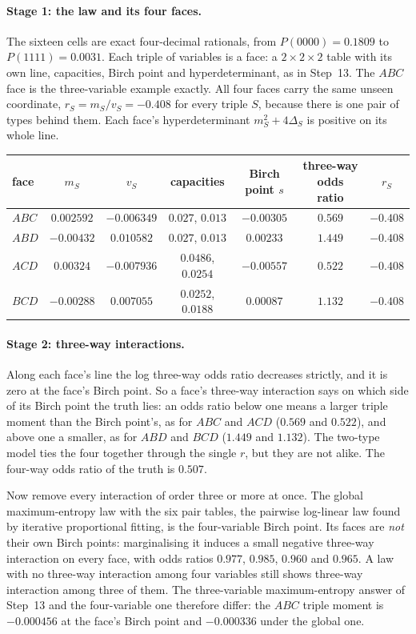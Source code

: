 \documentclass[11pt]{article}
\theoremstyle{definition}\newtheorem{definition}{Definition}\newtheorem{remark}{Remark}
\begin{document}
\paragraph{Stage 1: the law and its four faces.} The sixteen cells are exact four-decimal rationals, from $P(0000)=0.1809$ to
$P(1111)=0.0031$. Each triple of variables is a face: a $2\times2\times2$ table with its own line, capacities, Birch point and
hyperdeterminant, as in Step~13. The $ABC$ face is the three-variable example exactly. All four faces carry the same unseen coordinate,
$r_S=m_S/v_S=-0.408$ for every triple $S$, because there is one pair of types behind them. Each face's hyperdeterminant
$m_S^2+4\Delta_S$ is positive on its whole line.
\begin{center}\small
\begin{tabular}{lcccccc}\toprule
face & $m_S$ & $v_S$ & capacities & Birch point $s$ & three-way odds ratio & $r_S$\\\midrule
$ABC$ & $0.002592$ & $-0.006349$ & $0.027$, $0.013$ & $-0.00305$ & $0.569$ & $-0.408$\\
$ABD$ & $-0.00432$ & $0.010582$ & $0.027$, $0.013$ & $0.00233$ & $1.449$ & $-0.408$\\
$ACD$ & $0.00324$ & $-0.007936$ & $0.0486$, $0.0254$ & $-0.00557$ & $0.522$ & $-0.408$\\
$BCD$ & $-0.00288$ & $0.007055$ & $0.0252$, $0.0188$ & $0.00087$ & $1.132$ & $-0.408$\\\bottomrule
\end{tabular}
\end{center}

\paragraph{Stage 2: three-way interactions.} Along each face's line the log three-way odds ratio decreases strictly, and it is zero at
the face's Birch point. So a face's three-way interaction says on which side of its Birch point the truth lies: an odds ratio below
one means a larger triple moment than the Birch point's, as for $ABC$ and $ACD$ ($0.569$ and $0.522$), and above one a smaller, as for
$ABD$ and $BCD$ ($1.449$ and $1.132$). The two-type model ties the four
together through the single $r$, but they are not alike. The four-way odds ratio of the truth is $0.507$.

Now remove every interaction of order three or more at once. The global maximum-entropy law with the six pair tables, the pairwise
log-linear law found by iterative proportional fitting, is the four-variable Birch point. Its faces are \emph{not} their own Birch
points: marginalising it induces a small negative three-way interaction on every face, with odds ratios $0.977$, $0.985$, $0.960$ and
$0.965$. A law with no three-way interaction among four variables still shows three-way interaction among three of them. The
three-variable maximum-entropy answer of Step~13 and the four-variable one therefore differ: the $ABC$ triple moment is $-0.000456$
at the face's Birch point and $-0.000336$ under the global one.
\end{document}
